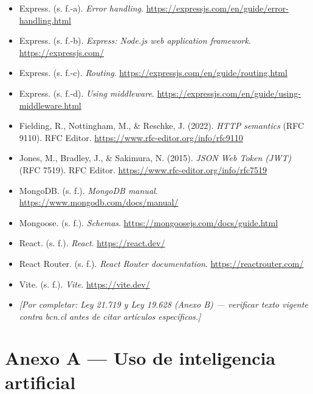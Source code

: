 \documentclass[11pt,letterpaper]{article}
\newcommand{\porcompletar}[1]{\textcolor{robinorange}{\textit{[Por completar: #1]}}}
\begin{document}
\begin{itemize}
\item Express. (s. f.-a). \textit{Error handling}. \href{https://expressjs.com/en/guide/error-handling.html}{https://expressjs.com/en/guide/error-handling.html}
\item Express. (s. f.-b). \textit{Express: Node.js web application framework}. \href{https://expressjs.com/}{https://expressjs.com/}
\item Express. (s. f.-c). \textit{Routing}. \href{https://expressjs.com/en/guide/routing.html}{https://expressjs.com/en/guide/routing.html}
\item Express. (s. f.-d). \textit{Using middleware}. \href{https://expressjs.com/en/guide/using-middleware.html}{https://expressjs.com/en/guide/using-middleware.html}
\item Fielding, R., Nottingham, M., \& Reschke, J. (2022). \textit{HTTP semantics} (RFC 9110). RFC Editor. \href{https://www.rfc-editor.org/info/rfc9110}{https://www.rfc-editor.org/info/rfc9110}
\item Jones, M., Bradley, J., \& Sakimura, N. (2015). \textit{JSON Web Token (JWT)} (RFC 7519). RFC Editor. \href{https://www.rfc-editor.org/info/rfc7519}{https://www.rfc-editor.org/info/rfc7519}
\item MongoDB. (s. f.). \textit{MongoDB manual}. \href{https://www.mongodb.com/docs/manual/}{https://www.mongodb.com/docs/manual/}
\item Mongoose. (s. f.). \textit{Schemas}. \href{https://mongoosejs.com/docs/guide.html}{https://mongoosejs.com/docs/guide.html}
\item React. (s. f.). \textit{React}. \href{https://react.dev/}{https://react.dev/}
\item React Router. (s. f.). \textit{React Router documentation}. \href{https://reactrouter.com/}{https://reactrouter.com/}
\item Vite. (s. f.). \textit{Vite}. \href{https://vite.dev/}{https://vite.dev/}
\item \porcompletar{Ley 21.719 y Ley 19.628 (Anexo B) — verificar texto vigente contra bcn.cl antes de citar artículos específicos.}
\end{itemize}

\section{Anexo A — Uso de inteligencia artificial}
\end{document}
